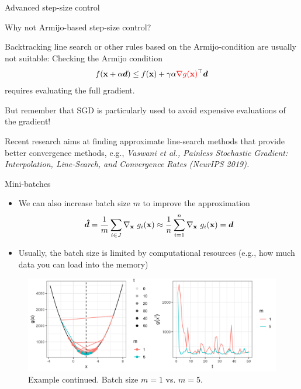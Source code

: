 \documentclass[11pt,compress,t,notes=noshow, xcolor=table]{beamer}
\begin{document}
\begin{vbframe}{Advanced step-size control} 


	\begin{blocki}{Why not Armijo-based step-size control? }
		\item Backtracking line search or other rules based on the Armijo-condition are usually not suitable: Checking the Armijo condition 
		$$
		f(\mathbf{x} + \alpha \bm{d}) \le f(\mathbf{x}) + \gamma \alpha \textcolor{red}{\nabla g(\mathbf{x})}^\top \bm{d}
		$$
		requires evaluating the full gradient.
		\item But remember that SGD is particularly used to avoid expensive evaluations of the gradient! 
		\item Recent research aims at finding approximate line-search methods that provide better convergence methods, e.g., \emph{Vaswani et al., Painless Stochastic Gradient: Interpolation, Line-Search, and Convergence Rates (NeurIPS 2019).}
	\end{blocki}

\end{vbframe}


\begin{vbframe}{Mini-batches} 

\begin{itemize}
	\item We can also increase batch size $m$ to improve the approximation
	$$
		\bm{\hat d} = \frac{1}{m} \sum_{i \in J} \nabla_{\mathbf{x}}~ g_i(\mathbf{x}) \approx \frac{1}{n} \sum\limits_{i=1}^n \nabla_{\mathbf{x}}~ g_i(\mathbf{x}) = \bm{d} 
	$$
	\item Usually, the batch size is limited by computational resources (e.g., how much data you can load into the memory)
\end{itemize}

 	\begin{figure}
 		\vspace{-0.3cm}
 		\centering
 		\includegraphics[width = 1\textwidth]{figure_man/sgd_example_batch_size.png} \newline
		Example continued. Batch size $m = 1$ vs. $m = 5$. 
 	\end{figure}

\end{vbframe}
\end{document}

